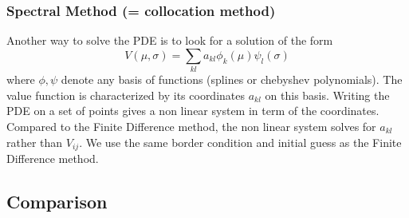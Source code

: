 \documentclass[english]{article}
\begin{document}
\subsubsection{Spectral Method (= collocation method)}
Another way to solve the PDE is to look for a solution of the form
$$V(\mu, \sigma) = \sum_{kl} a_{kl} \phi_k(\mu)\psi_l(\sigma)$$
where $\phi, \psi$ denote any basis of functions (splines or chebyshev polynomials).
The value function is characterized by its coordinates $a_{kl}$ on this basis. Writing the PDE on a set of points gives a non linear system in term of the coordinates. Compared to the Finite Difference method, the non linear system solves for $a_{kl}$ rather than $V_{ij}$. We use the same border condition and initial guess as the Finite Difference method.

\subsection{Comparison}
\end{document}

